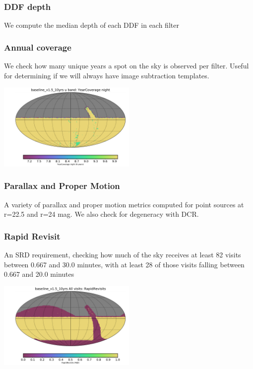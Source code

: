 {\subsubsection{DDF depth}

We compute the median depth of each DDF in each filter


\subsubsection{Annual coverage}

We check how many unique years a spot on the sky is observed per filter. Useful for determining if we will always have image subtraction templates.

\includegraphics[width=0.5\textwidth]{metric_summary/sci_baseline_v1.5_10yrs/baseline_v1_5_10yrs_YearCoverage_night_u_band_HEAL_SkyMap.pdf}

\subsubsection{Parallax and Proper Motion}

A variety of parallax and proper motion metrics computed for point sources at r=22.5 and r=24 mag. We also check for degeneracy with DCR.

\subsubsection{Rapid Revisit}

An SRD requirement, checking how much of the sky receives at least 82 visits between 0.667 and 30.0 minutes, with at least 28 of those visits falling between 0.667 and 20.0 minutes

\includegraphics[width=0.5\textwidth]{metric_summary/sci_baseline_v1.5_10yrs/baseline_v1_5_10yrs_RapidRevisits_All_visits_HEAL_SkyMap.pdf}

}
